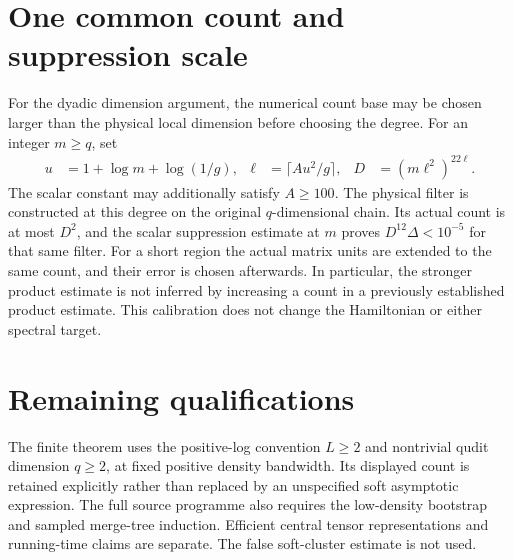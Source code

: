 \documentclass{article}
\begin{document}
\section{One common count and suppression scale}

For the dyadic dimension argument, the numerical count base may be chosen
larger than the physical local dimension before choosing the degree.
For an integer $m\ge q$, set
\begin{align}
 u&=1+\log m+\log(1/g),&
 \ell&=\lceil Au^2/g\rceil,& D&=(m\ell^2)^{22\ell}.
    \label{eq:ld_common_count_parameters}
\end{align}
The scalar constant may additionally satisfy $A\ge100$.
The physical filter is constructed at this degree on the original
$q$-dimensional chain. Its actual count is at most $D^2$, and the scalar
suppression estimate at $m$ proves $D^{12}\Delta<10^{-5}$ for that same
filter. For a short region the actual matrix units are extended to the
same count, and their error is chosen afterwards. In particular, the
stronger product estimate is not inferred by increasing a count in a
previously established product estimate. This calibration does not change
the Hamiltonian or either spectral target.

\section{Remaining qualifications}

The finite theorem uses the positive-log convention $L\ge2$ and
nontrivial qudit dimension $q\ge2$, at fixed positive density bandwidth.
Its displayed count is retained explicitly rather than replaced by an
unspecified soft asymptotic expression. The full source programme also
requires the low-density bootstrap and sampled merge-tree induction.
Efficient central tensor representations and running-time claims are
separate. The false soft-cluster estimate is not used.



\end{document}
